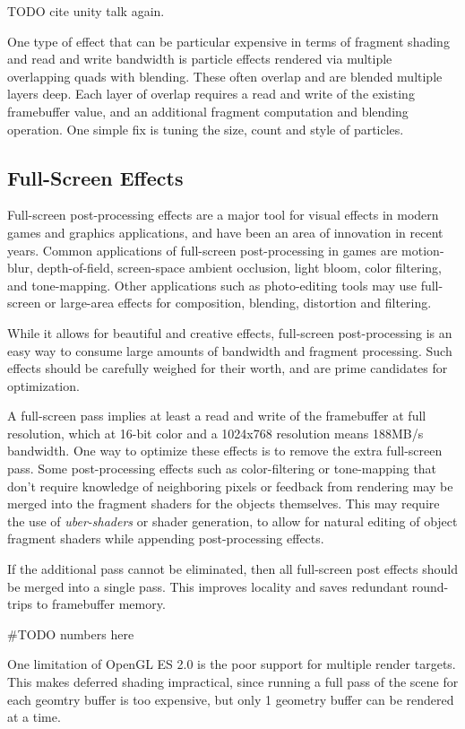 TODO cite unity talk again.

One type of effect that can be particular expensive in terms of fragment
shading and read and write bandwidth is particle effects rendered via multiple
overlapping quads with blending.  These often overlap and are blended multiple
layers deep.  Each layer of overlap requires a read and write of the existing
framebuffer value, and an additional fragment computation and blending
operation.  One simple fix is tuning the size, count and style of particles.

\subsection {Full-Screen Effects} 
Full-screen post-processing effects are a major tool for visual effects in
modern games and graphics applications, and have been an area of innovation in
recent years.   Common applications of full-screen post-processing in games are
motion-blur, depth-of-field, screen-space ambient occlusion, light bloom, color
filtering, and tone-mapping.  Other applications such as photo-editing tools
may use full-screen or large-area effects for composition, blending, distortion
and filtering.

While it allows for beautiful and creative effects, full-screen post-processing
is an easy way to consume large amounts of bandwidth and fragment processing.
Such effects should be carefully weighed for their worth, and are prime
candidates for optimization.  

A full-screen pass implies at least a read and write of the framebuffer at full
resolution, which at 16-bit color and a 1024x768 resolution means 188MB/s
bandwidth.  One way to optimize these effects is to remove the extra
full-screen pass.  Some post-processing effects such as color-filtering or
tone-mapping that don't require knowledge of neighboring pixels or feedback
from rendering may be merged into the fragment shaders for the objects
themselves.  This may require the use of \textit{uber-shaders} or shader
generation, to allow for natural editing of object fragment shaders while
appending post-processing effects.

If the additional pass cannot be eliminated, then all full-screen post effects should be merged into a single pass.  This improves locality and saves redundant round-trips to framebuffer memory.

#TODO numbers here

One limitation of OpenGL ES 2.0 is the poor support for multiple render
targets.  This makes deferred shading impractical, since running a full pass of
the scene for each geomtry buffer is too expensive, but only 1 geometry buffer
can be rendered at a time.

